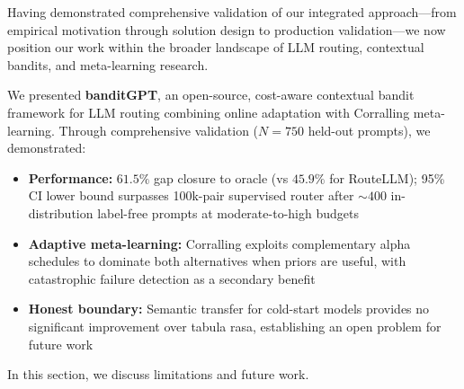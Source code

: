 Having demonstrated comprehensive validation of our integrated approach---from empirical motivation through solution design to production validation---we now position our work within the broader landscape of LLM routing, contextual bandits, and meta-learning research.


We presented \textbf{banditGPT}, an open-source, cost-aware contextual bandit framework for LLM routing combining online adaptation with Corralling meta-learning. Through comprehensive validation ($N{=}750$ held-out prompts), we demonstrated:

\begin{itemize}
    \item \textbf{Performance:} $61.5\%$ gap closure to oracle (vs $45.9\%$ for RouteLLM); 95\% CI lower bound surpasses 100k-pair supervised router after ${\sim}400$ in-distribution label-free prompts at moderate-to-high budgets
    \item \textbf{Adaptive meta-learning:} Corralling exploits complementary alpha schedules to dominate both alternatives when priors are useful, with catastrophic failure detection as a secondary benefit
    \item \textbf{Honest boundary:} Semantic transfer for cold-start models provides no significant improvement over tabula rasa, establishing an open problem for future work
\end{itemize}

In this section, we discuss limitations and future work.

% 
% 
%
